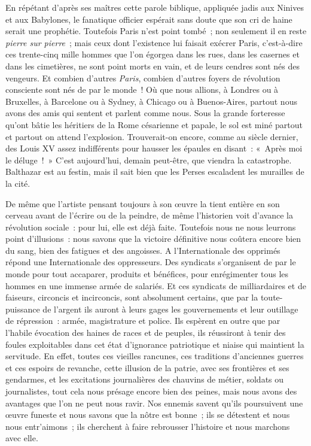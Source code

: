 \documentclass[french,twoside]{book} %
\begin{document}
En répétant d’après ses maîtres cette parole biblique, appliquée jadis aux Ninives et aux Babylones, le fanatique officier espérait sans doute que son cri de haine serait une prophétie. Toutefois Paris n’est point tombé ; non seulement il en reste \emph{pierre sur pierre} ; mais ceux dont l’existence lui faisait exécrer Paris, c’est-à-dire ces trente-cinq mille hommes que l’on égorgea dans les rues, dans les casernes et dans les cimetières,  ne sont point morts en vain, et de leurs cendres sont nés des vengeurs. Et combien d’autres \emph{Paris}, combien d’autres foyers de révolution consciente sont nés de par le monde ! Où que nous allions, à Londres ou à Bruxelles, à Barcelone ou à Sydney, à Chicago ou à Buenos-Aires, partout nous avons des amis qui sentent et parlent comme nous. Sous la grande forteresse qu’ont bâtie les héritiers de la Rome césarienne et papale, le sol est miné partout et partout on attend l’explosion. Trouverait-on encore, comme au siècle dernier, des Louis XV assez indifférents pour hausser les épaules en disant : « Après moi le déluge ! » C’est aujourd’hui, demain peut-être, que viendra la catastrophe. Balthazar est au festin, mais il  sait bien que les Perses escaladent les murailles de la cité.\par
De même que l’artiste pensant toujours à son œuvre la tient entière en son cerveau avant de l’écrire ou de la peindre, de même l’historien voit d’avance la révolution sociale : pour lui, elle est déjà faite. Toutefois nous ne nous leurrons point d’illusions : nous savons que la victoire définitive nous coûtera encore bien du sang, bien des fatigues et des angoisses. A l’Internationale des opprimés répond une Internationale des oppresseurs. Des syndicats s’organisent de par le monde pour tout accaparer, produits et bénéfices, pour enrégimenter tous les hommes en une immense armée de salariés. Et ces syndicats de milliardaires et de faiseurs,  circoncis et incirconcis, sont absolument certains, que par la toute-puissance de l’argent ils auront à leurs gages les gouvernements et leur outillage de répression : armée, magistrature et police. Ils espèrent en outre que par l’habile évocation des haines de races et de peuples, ils réussiront à tenir des foules exploitables dans cet état d’ignorance patriotique et niaise qui maintient la servitude. En effet, toutes ces vieilles rancunes, ces traditions d’anciennes guerres et ces espoirs de revanche, cette illusion de la patrie, avec ses frontières et ses gendarmes, et les excitations journalières des chauvins de métier, soldats ou journalistes, tout cela nous présage encore bien des peines, mais nous avons des avantages que l’on ne peut nous ravir.  Nos ennemis savent qu’ils poursuivent une œuvre funeste et nous savons que la nôtre est bonne ; ils se détestent et nous nous entr’aimons ; ils cherchent à faire rebrousser l’histoire et nous marchons avec elle.\par
\end{document}
